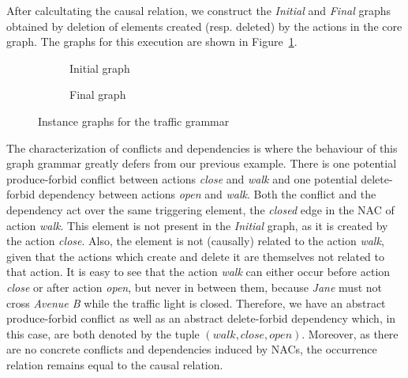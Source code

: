 After calcultating the causal relation, we construct the \emph{Initial} and \emph{Final} graphs obtained by deletion of elements created (resp. deleted) by the actions in the core graph. The graphs for this execution are shown in Figure~\ref{fig:tests:graphs-traffic}.

\begin{figure}[!ht]
  \centering
  \begin{subfigure}[t]{.5\textwidth}
    \centerline{}
    \caption{Initial graph}
  \end{subfigure}%
  \begin{subfigure}[t]{.5\textwidth}
    \centerline{}
    \caption{Final graph}
  \end{subfigure}
  \caption{Instance graphs for the traffic grammar}\label{fig:tests:graphs-traffic}
\end{figure}

  The characterization of conflicts and dependencies is where the behaviour of this graph grammar greatly defers from our previous example.
  There is one potential produce-forbid conflict between actions \emph{close} and \emph{walk} and one potential delete-forbid dependency between actions \emph{open} and \emph{walk}.
  Both the conflict and the dependency act over the same triggering element, the \emph{closed} edge in the NAC of action \emph{walk}.
  This element is not present in the \emph{Initial} graph, as it is created by the action \emph{close}.
  Also, the element is not (causally) related to the action \emph{walk}, given that the actions which create and delete it are themselves not related to that action.
  It is easy to see that the action \emph{walk} can either occur before action \emph{close} or after action \emph{open}, but never in between them, because \emph{Jane} must not cross \emph{Avenue B} while the traffic light is closed.
  Therefore, we have an abstract produce-forbid conflict as well as an abstract delete-forbid dependency which, in this case, are both denoted by the tuple $(walk,close, open)$. Moreover, as there are no concrete conflicts and dependencies induced by NACs, the occurrence relation remains equal to the causal relation.

